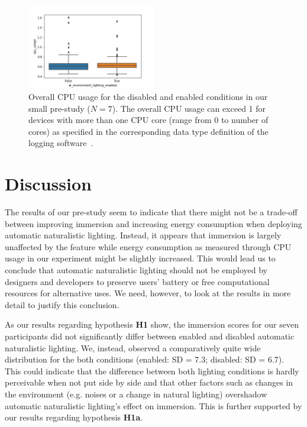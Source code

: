 \documentclass[12pt,twoside,english]{article}
\begin{document}
\begin{figure}[h]
    \centering
    \includegraphics[width=0.5\textwidth]{imgs/cpu_raw_plot}
    \caption{Overall \gls{CPU} usage for the disabled and enabled conditions in our small pre-study ($ N = 7 $). The overall \gls{CPU} usage can exceed 1 for devices with more than one \gls{CPU} core (range from 0 to number of cores) as specified in the corresponding data type definition of the logging software~\cite{apple_system_2020}.}
    \label{fig:cpu_raw_plot}
\end{figure}


\section{Discussion}
\label{sect:discussion}

The results of our pre-study seem to indicate that there might not be a trade-off between improving immersion and increasing energy consumption when deploying automatic naturalistic lighting.
Instead, it appears that immersion is largely unaffected by the feature while energy consumption as measured through \gls{CPU} usage in our experiment might be slightly increased.
This would lead us to conclude that automatic naturalistic lighting should not be employed by designers and developers to preserve users' battery or free computational resources for alternative uses.
We need, however, to look at the results in more detail to justify this conclusion.

As our results regarding hypothesis \textbf{H1} show, the immersion scores for our seven participants did not significantly differ between enabled and disabled automatic naturalistic lighting.
We, instead, observed a comparatively quite wide distribution for the both conditions (enabled: SD = 7.3; disabled: SD = 6.7).
This could indicate that the difference between both lighting conditions is hardly perceivable when not put side by side and that other factors such as changes in the environment (e.g. noises or a change in natural lighting) overshadow automatic naturalistic lighting's effect on immersion.
This is further supported by our results regarding hypothesis \textbf{H1a}.
\end{document}
